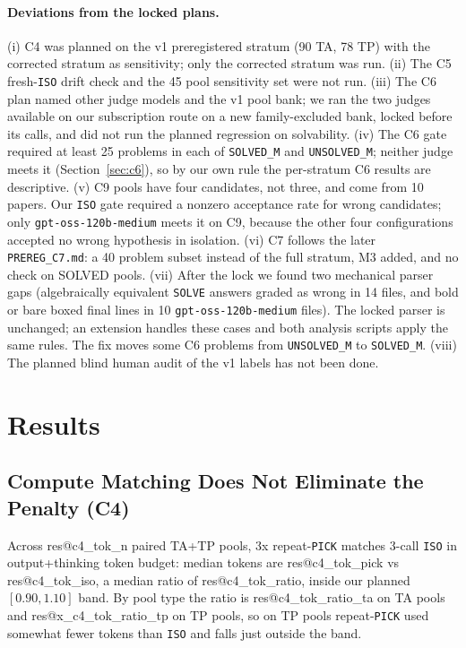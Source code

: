 \documentclass[10pt,twocolumn]{article}
\makeatletter
\newcommand{\res}[1]{\csname res@#1\endcsname}
\makeatother
\begin{document}
\paragraph{Deviations from the locked plans.}
(i) C4 was planned on the v1 preregistered stratum (90 TA, 78 TP) with the corrected stratum as sensitivity; only the corrected stratum was run. (ii) The C5 fresh-\texttt{ISO} drift check and the 45 pool sensitivity set were not run. (iii) The C6 plan named other judge models and the v1 pool bank; we ran the two judges available on our subscription route on a new family-excluded bank, locked before its calls, and did not run the planned regression on solvability. (iv) The C6 gate required at least 25 problems in each of \texttt{SOLVED\_M} and \texttt{UNSOLVED\_M}; neither judge meets it (Section~\ref{sec:c6}), so by our own rule the per-stratum C6 results are descriptive. (v) C9 pools have four candidates, not three, and come from 10 papers. Our \texttt{ISO} gate required a nonzero acceptance rate for wrong candidates; only \texttt{gpt-oss-120b-medium} meets it on C9, because the other four configurations accepted no wrong hypothesis in isolation. (vi) C7 follows the later \texttt{PREREG\_C7.md}: a 40 problem subset instead of the full stratum, M3 added, and no check on SOLVED pools. (vii) After the lock we found two mechanical parser gaps (algebraically equivalent \texttt{SOLVE} answers graded as wrong in 14 files, and bold or bare boxed final lines in 10 \texttt{gpt-oss-120b-medium} files). The locked parser is unchanged; an extension handles these cases and both analysis scripts apply the same rules. The fix moves some C6 problems from \texttt{UNSOLVED\_M} to \texttt{SOLVED\_M}. (viii) The planned blind human audit of the v1 labels has not been done.

\section{Results}

\subsection{Compute Matching Does Not Eliminate the Penalty (C4)}
Across \res{c4_tok_n} paired TA+TP pools, 3x repeat-\texttt{PICK} matches 3-call \texttt{ISO} in output+thinking token budget: median tokens are \res{c4_tok_pick} vs \res{c4_tok_iso}, a median ratio of \res{c4_tok_ratio}, inside our planned $[0.90, 1.10]$ band. By pool type the ratio is \res{c4_tok_ratio_ta} on TA pools and \res{x_c4_tok_ratio_tp} on TP pools, so on TP pools repeat-\texttt{PICK} used somewhat fewer tokens than \texttt{ISO} and falls just outside the band.
\end{document}
